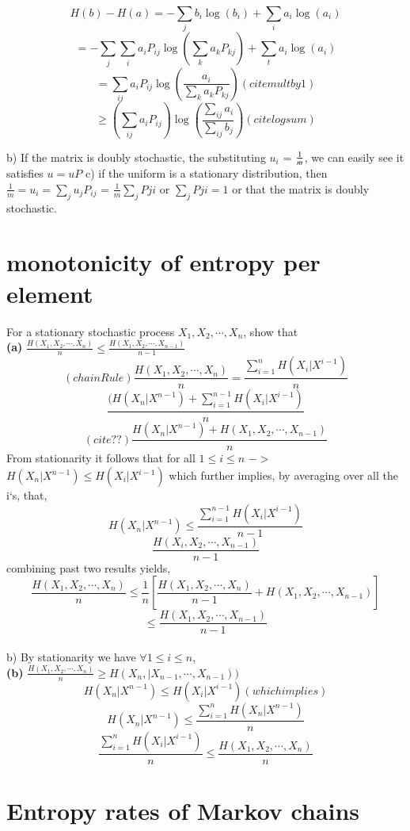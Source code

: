 \documentclass[10pt]{article}
\begin{document}
\begin{tiny}
\begin{multicols}{3}
\[H(b) - H(a) = -\sum_j b_i \log (b_i) + \sum_i a_i \log (a_i)  \]
\[= - \sum_j \sum_i a_iP_{ij} \log(\sum_k a_kP_{kj})+\sum_t a_i \log (a_i) \]	
\[= \sum_{ij}a_iP_{ij} \log(\frac{ a_i }{\sum_{k} a_kP_{kj}}) (cite mult by 1)\]	
\[ \ge (\sum_{ij}a_iP_{ij}) \log(\frac{\sum_{ij} a_i }{\sum_{ij} b_j }) (cite log sum)\]	

b) If the matrix is doubly stochastic, the substituting $u_i$ = $1\over{m}$, we can easily see it satisfies $u=uP$
c) if the uniform is a stationary distribution, then $\frac{1}{m} = u_i = \sum_{j}u_{j}P_{ij}$ = $ \frac{1}{m}\sum_jP{ji}$ or $\sum_jP{ji}=1$ or that the matrix is doubly stochastic.

\section*{monotonicity of entropy per element}
For a stationary stochastic process $X_1, X_2, \cdots , X_n$, show that
\\ \textbf{(a)} $\frac{H(X_1,X_2,\cdots,X_n)}{n} \le \frac{H(X_1,X_2,\cdots,X_{n - 1})}{ n - 1} $
\[ (chainRule)  \frac{H(X_1,X_2,\cdots,X_n)}{n} = \frac{\sum_{i=1}^n H(X_i | X^{i-1})}{n} \]
\[ \frac{(H(X_n | X^{n-1}) + \sum_{i=1}^{n-1} H(X_i |X^{i-1}) } {n} \]
\[ (cite??) \frac{H(X_n | X^{n-1}) + H(X_1,X_2,\cdots,X_{n-1}) } {n} \]
From stationarity it follows that for all $1\le i \le n$ $->$ $H(X_n | X^{n-1}) \le H(X_i | X^{i-1}) $
which further implies, by averaging over all the i`s, that,
\[ H(X_n | X^{n-1}) \le \frac{ \sum_{i=1}^{n-1} H(X_i | X^{i-1})} {n-1} \]
\[ \frac{ H(X_i,X_2,\cdots,X_{n-1})} {n-1} \]
combining past two results yields, 
\[ \frac{H(X_1,X_2,\cdots,X_n)}{n} \le \frac{1}{n} [ \frac{ H(X_1,X_2,\cdots,X_n) } {n-1}  + H(X_1,X_2,\cdots,X_{n-1}) ] \]
\[ \le \frac{H(X_1,X_2,\cdots,X_{n-1})}{n-1} \]
\\



b) By stationarity we have $\forall 1 \le i \le n$,
\\ \textbf{(b)} $\frac{H(X_1,X_2,\cdots,X_n)}{n} \ge H(X_n, \mid X_{n -1}, \cdots, X_{n - 1}) )$
\[ H(X_n | X^{n-1} ) \le H(X_i | X^{i-1}) (whichimplies)\]
\[H(X_n | X^{n-1}) \le \frac{\sum_{i=1}^n H(X_n | X^{n-1}) } {n} \]
\[ \frac{\sum_{i=1}^n H(X_i | X^{i-1}) } {n} \le \frac{H(X_1,X_2,\cdots,X_n)}{n}\]

\section*{Entropy rates of Markov chains}


\end{multicols}
\end{tiny}
\end{document}
